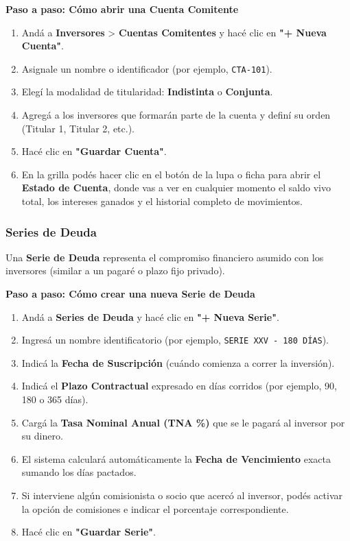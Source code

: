 \documentclass[12pt,a4paper]{article}
\renewcommand{\_}{\textunderscore\allowbreak}
\begin{document}
\textbf{Paso a paso: Cómo abrir una Cuenta Comitente}
\begin{enumerate}
    \item Andá a \textbf{Inversores} > \textbf{Cuentas Comitentes} y hacé clic en \textbf{"+ Nueva Cuenta"}.
    \item Asignale un nombre o identificador (por ejemplo, \texttt{CTA-101}).
    \item Elegí la modalidad de titularidad: \textbf{Indistinta} o \textbf{Conjunta}.
    \item Agregá a los inversores que formarán parte de la cuenta y definí su orden (Titular 1, Titular 2, etc.).
    \item Hacé clic en \textbf{"Guardar Cuenta"}.
    \item En la grilla podés hacer clic en el botón de la lupa o ficha para abrir el \textbf{Estado de Cuenta}, donde vas a ver en cualquier momento el saldo vivo total, los intereses ganados y el historial completo de movimientos.
\end{enumerate}

\subsubsection{Series de Deuda}
Una \textbf{Serie de Deuda} representa el compromiso financiero asumido con los inversores (similar a un pagaré o plazo fijo privado).

\textbf{Paso a paso: Cómo crear una nueva Serie de Deuda}
\begin{enumerate}
    \item Andá a \textbf{Series de Deuda} y hacé clic en \textbf{"+ Nueva Serie"}.
    \item Ingresá un nombre identificatorio (por ejemplo, \texttt{SERIE XXV - 180 DÍAS}).
    \item Indicá la \textbf{Fecha de Suscripción} (cuándo comienza a correr la inversión).
    \item Indicá el \textbf{Plazo Contractual} expresado en días corridos (por ejemplo, 90, 180 o 365 días).
    \item Cargá la \textbf{Tasa Nominal Anual (TNA \%)} que se le pagará al inversor por su dinero.
    \item El sistema calculará automáticamente la \textbf{Fecha de Vencimiento} exacta sumando los días pactados.
    \item Si interviene algún comisionista o socio que acercó al inversor, podés activar la opción de comisiones e indicar el porcentaje correspondiente.
    \item Hacé clic en \textbf{"Guardar Serie"}.
\end{enumerate}
\end{document}

